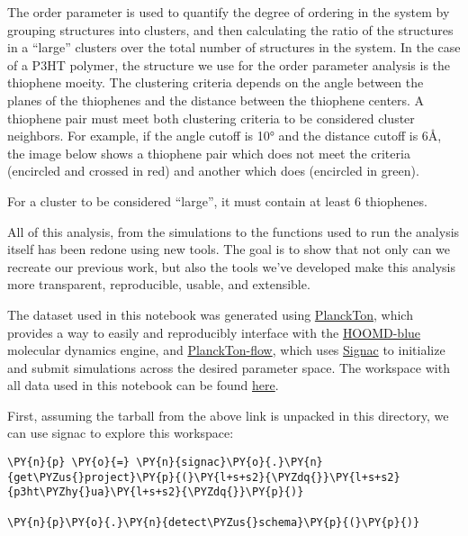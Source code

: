 The order parameter is used to quantify the degree of ordering in the
system by grouping structures into clusters, and then calculating the
ratio of the structures in a ``large'' clusters over the total number of
structures in the system. In the case of a P3HT polymer, the structure
we use for the order parameter analysis is the thiophene moeity. The
clustering criteria depends on the angle between the planes of the
thiophenes and the distance between the thiophene centers. A thiophene
pair must meet both clustering criteria to be considered cluster
neighbors. For example, if the angle cutoff is 10° and the distance
cutoff is 6\AA, the image below shows a thiophene pair which does not meet
the criteria (encircled and crossed in red) and another which does
(encircled in green).

    \begin{center}
    \end{center}

For a cluster to be considered ``large'', it must contain at least 6
thiophenes.

All of this analysis, from the simulations to the functions used to run
the analysis itself has been redone using new tools. The goal is to show
that not only can we recreate our previous work, but also the tools
we've developed make this analysis more transparent, reproducible,
usable, and extensible.

The dataset used in this notebook was generated using
\href{https://github.com/cmelab/planckton-flow}{PlanckTon}, which
provides a way to easily and reproducibly interface with the
\href{https://hoomd-blue.readthedocs.io/en/latest/index.html}{HOOMD-blue}
molecular dynamics engine, and
\href{https://github.com/cmelab/planckton-flow}{PlanckTon-flow}, which
uses \href{https://docs.signac.io/en/latest/}{Signac} to initialize and
submit simulations across the desired parameter space. The workspace
with all data used in this notebook can be found
\href{https://zenodo.org/record/5911940}{here}.

First, assuming the tarball from the above link is unpacked in this
directory, we can use signac to explore this workspace:

    \begin{tcolorbox}[breakable, size=fbox, boxrule=1pt, pad at break*=1mm,colback=cellbackground, colframe=cellborder]
\begin{Verbatim}[commandchars=\\\{\}]
\PY{n}{p} \PY{o}{=} \PY{n}{signac}\PY{o}{.}\PY{n}{get\PYZus{}project}\PY{p}{(}\PY{l+s+s2}{\PYZdq{}}\PY{l+s+s2}{p3ht\PYZhy{}ua}\PY{l+s+s2}{\PYZdq{}}\PY{p}{)}

\PY{n}{p}\PY{o}{.}\PY{n}{detect\PYZus{}schema}\PY{p}{(}\PY{p}{)}
\end{Verbatim}
\end{tcolorbox}

